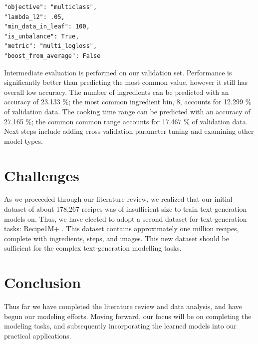 \documentclass[sigconf]{acmart}
\begin{document}
\begin{verbatim}
"objective": "multiclass",
"lambda_l2": .05,
"min_data_in_leaf": 100,
"is_unbalance": True,
"metric": "multi_logloss",
"boost_from_average": False
\end{verbatim}

Intermediate evaluation is performed on our validation set. Performance is significantly better than predicting the most common value, however it still has overall low accuracy. The number of ingredients can be predicted with an accuracy of 23.133 \%; the most common ingredient bin, 8, accounts for 12.299 \% of validation data. The cooking time range can be predicted with an accuracy of 27.165 \%; the common common range accounts for 17.467 \% of validation data. Next steps include adding cross-validation parameter tuning and examining other model types.


\section{Challenges}

As we proceeded through our literature review, we realized that our initial dataset \cite{FoodComRecipe} of about 178,267 recipes was of insufficient size to train text-generation models on. Thus, we have elected to adopt a second dataset for text-generation tasks: Recipe1M+ \cite{Recipe1M}. This dataset contains approximately one million recipes, complete with ingredients, steps, and images. This new dataset should be sufficient for the complex text-generation modelling tasks.

\section{Conclusion}
Thus far we have completed the literature review and data analysis, and have begun our modeling efforts. Moving forward, our focus will be on completing the modeling tasks, and subsequently incorporating the learned models into our practical applications.

%
\begin{acks}
\end{acks}



\end{document}
